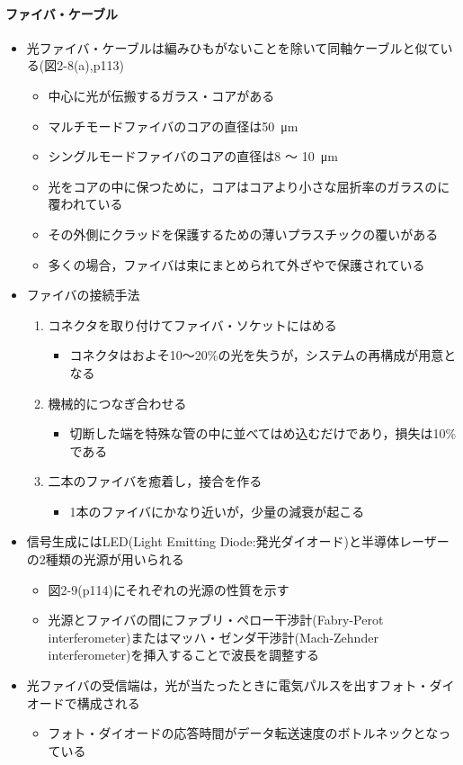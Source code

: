 \documentclass[a4paper]{ltjsarticle}
\begin{document}
			\paragraph{ファイバ・ケーブル}
				\begin{itemize}
					\item 光ファイバ・ケーブルは編みひもがないことを除いて同軸ケーブルと似ている(図2-8(a),p113)
					\begin{itemize}
						\item 中心に光が伝搬するガラス・コアがある
						\item マルチモードファイバのコアの直径は\SI{50}{\micro m}
						\item シングルモードファイバのコアの直径は8 ～ \SI{10}{\micro m}
						\item 光をコアの中に保つために，コアはコアより小さな屈折率のガラスのに覆われている
						\item その外側にクラッドを保護するための薄いプラスチックの覆いがある
						\item 多くの場合，ファイバは束にまとめられて外ざやで保護されている
					\end{itemize}
					\item ファイバの接続手法
					\begin{enumerate}
						\item コネクタを取り付けてファイバ・ソケットにはめる
						\begin{itemize}
							\item コネクタはおよそ10～20\%の光を失うが，システムの再構成が用意となる
						\end{itemize}
						\item 機械的につなぎ合わせる
						\begin{itemize}
							\item 切断した端を特殊な管の中に並べてはめ込むだけであり，損失は10\%である
						\end{itemize}
						\item 二本のファイバを癒着し，接合を作る
						\begin{itemize}
							\item 1本のファイバにかなり近いが，少量の減衰が起こる
						\end{itemize}
					\end{enumerate}
					\item 信号生成にはLED(Light Emitting Diode:発光ダイオード)と半導体レーザーの2種類の光源が用いられる
					\begin{itemize}
						\item 図2-9(p114)にそれぞれの光源の性質を示す
						\item 光源とファイバの間にファブリ・ペロー干渉計(Fabry-Perot interferometer)またはマッハ・ゼンダ干渉計(Mach-Zehnder interferometer)を挿入することで波長を調整する
					\end{itemize}
					\item 光ファイバの受信端は，光が当たったときに電気パルスを出すフォト・ダイオードで構成される
					\begin{itemize}
						\item フォト・ダイオードの応答時間がデータ転送速度のボトルネックとなっている
					\end{itemize}
				\end{itemize}
\end{document}
